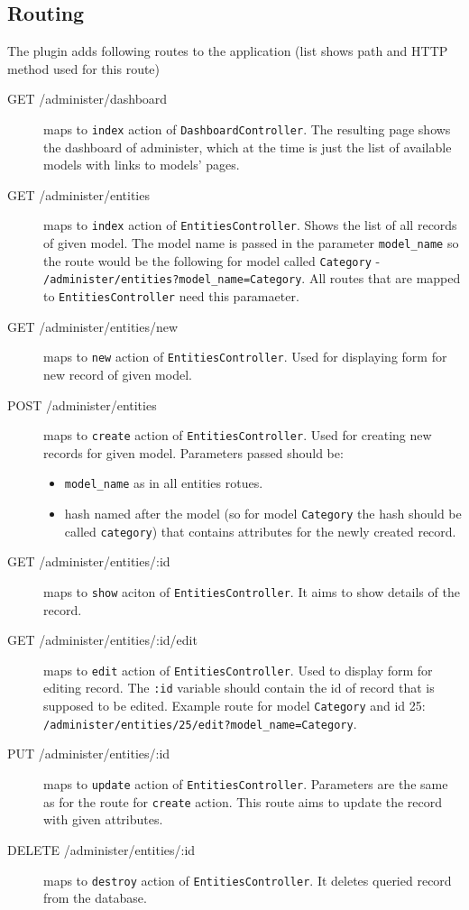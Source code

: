     \subsection{Routing}
      The plugin adds following routes to the application (list shows path and HTTP method used for this route)

      \begin{description}
        \item[GET /administer/dashboard] maps to \texttt{index} action of \texttt{DashboardController}. 
          The resulting page shows the dashboard of administer, which at the time is just the list
          of available models with links to models' pages.
        \item[GET /administer/entities] maps to \texttt{index} action of \texttt{EntitiesController}.
          Shows the list of all records of given model. The model name is passed in the parameter
          \texttt{model\_name} so the route would be the following for model called \texttt{Category} -
          \texttt{/administer/entities?model\_name=Category}. All routes that are mapped to \texttt{EntitiesController}
          need this paramaeter.
        \item[GET /administer/entities/new] maps to \texttt{new} action of \texttt{EntitiesController}.
          Used for displaying form for new record of given model. 
        \item[POST /administer/entities] maps to \texttt{create} action of \texttt{EntitiesController}.
          Used for creating new records for given model. Parameters passed should be:
          \begin{itemize}
            \item \texttt{model\_name} as in all entities rotues.
            \item hash named after the model (so for model \texttt{Category} the hash should be called
              \texttt{category}) that contains attributes for the newly created record.
          \end{itemize}
        \item[GET /administer/entities/:id] maps to \texttt{show} aciton of \texttt{EntitiesController}.
          It aims to show details of the record.
        \item[GET /administer/entities/:id/edit] maps to \texttt{edit} action of \texttt{EntitiesController}.
          Used to display form for editing record. The \texttt{:id} variable should contain the id of 
          record that is supposed to be edited. Example route for model \texttt{Category} and id 25:
          \texttt{/administer/entities/25/edit?model\_name=Category}.
        \item[PUT /administer/entities/:id] maps to \texttt{update} action of \texttt{EntitiesController}.
          Parameters are the same as for the route for \texttt{create} action. This route
          aims to update the record with given attributes.
        \item[DELETE /administer/entities/:id] maps to \texttt{destroy} action of \texttt{EntitiesController}.
          It deletes queried record from the database.
      \end{description}
    
